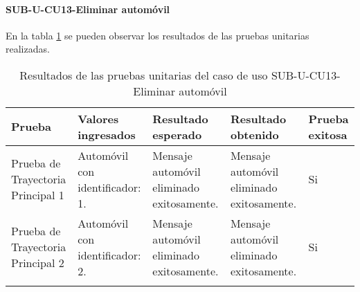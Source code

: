 \paragraph{SUB-U-CU13-Eliminar automóvil}\label{SUB-U-CU13:Pruebas}
En la tabla \ref{pruebas_unitarias_sub-u-cu13} se pueden observar los resultados de las pruebas unitarias realizadas.
\begin{longtable}{|M{2cm}| M{4.5cm}|M{3cm}|M{3cm}|M{1.5cm}|}
	\hline
	\textbf{Prueba} & \textbf{Valores ingresados} & \textbf{Resultado esperado} & \textbf{Resultado obtenido} & \textbf{Prueba exitosa} \\ \hline
	Prueba de Trayectoria Principal 1 & 
	Automóvil con identificador: 1.
	& 
	Mensaje automóvil eliminado exitosamente.
	&
	Mensaje automóvil eliminado exitosamente.
	& Si \\ \hline

	Prueba de Trayectoria Principal 2 & 
	Automóvil con identificador: 2.
	& 
	Mensaje automóvil eliminado exitosamente.
	&
	Mensaje automóvil eliminado exitosamente.
	& Si \\ \hline

	\caption{Resultados de las pruebas unitarias del caso de uso SUB-U-CU13-Eliminar automóvil}
	\label{pruebas_unitarias_sub-u-cu13}
\end{longtable}
